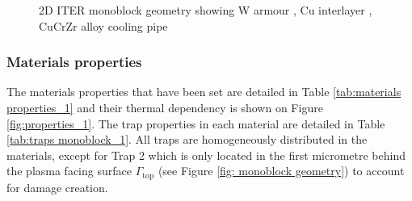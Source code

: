 \begin{figure}
     \caption{2D ITER monoblock geometry showing W armour \cruleme[grey]{0.3cm}{0.3cm}, Cu interlayer \cruleme[orange]{0.3cm}{0.3cm}, CuCrZr alloy cooling pipe  \cruleme[yellow]{0.3cm}{0.3cm}}\label{fig: monoblock geometry}
     \label{fig: monoblock 2d geometry}
    \end{figure}

\subsubsection{Materials properties}
The materials properties that have been set are detailed in Table \ref{tab:materials properties_1} and their thermal dependency is shown on Figure \ref{fig:properties_1}.
The trap properties in each material are detailed in Table \ref{tab:traps monoblock_1}.
All traps are homogeneously distributed in the materials, except for Trap 2 which is only located in the first micrometre behind the plasma facing surface $\Gamma_\mathrm{top}$ (see Figure \ref{fig: monoblock geometry}) to account for damage creation.

